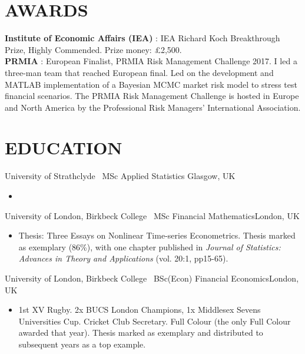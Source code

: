 \documentclass[letterpaper,11pt]{article}
\begin{document}
\section{AWARDS}
 \begin{itemize}[leftmargin=0in, label={}]
\small{\item{
\textbf{Institute of Economic Affairs (IEA)} {: IEA Richard Koch Breakthrough Prize, Highly Commended. Prize money: \pounds 2,500.} \vspace{2pt} \\
\textbf{PRMIA}     {: European Finalist, PRMIA Risk Management Challenge 2017. I led a three-man team that reached European final. Led on the development and MATLAB implementation of a Bayesian MCMC market risk model to stress test financial scenarios. The PRMIA Risk Management Challenge is hosted in Europe and North America by the Professional Risk Managers' International Association.} \vspace{2pt} \\
}}
 \end{itemize}

\section{EDUCATION}
\resumeSubHeadingListStart

\resumeSubheading
{University of Strathclyde}{~}
{MSc Applied Statistics }{Glasgow, UK}
\begin{itemize}
\item[] 
\end{itemize}

\resumeSubheading
{University of London, Birkbeck College}{~}
{MSc Financial Mathematics}{London, UK}
\begin{itemize}
\item[] Thesis: Three Essays on Nonlinear Time-series Econometrics. Thesis marked as exemplary (86\%), with one chapter published in \textit{Journal of Statistics: Advances in Theory and Applications} (vol. 20:1, pp15-65). 
\end{itemize}

\resumeSubheading
{University of London, Birkbeck College}{~}
{BSc(Econ) Financial Economics}{London, UK}
\begin{itemize}
\item[] 1st XV Rugby. 2x BUCS London Champions, 1x Middlesex Sevens Universities Cup. Cricket Club Secretary. Full Colour (the only Full Colour awarded that year). Thesis marked as exemplary and distributed to subsequent years as a top example.
\end{itemize}
\resumeSubHeadingListEnd
\end{document}
